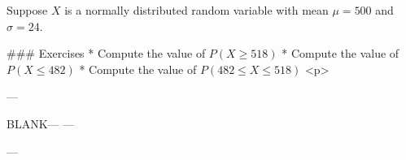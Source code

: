 
Suppose $X$ is a normally distributed random variable with mean $\mu =500$ and $\sigma = 24$.

### Exercises 
*  Compute the value of $P(X \geq 518)$
*  Compute the value of $P(X \leq 482)$
*  Compute the value of $P(482 \leq X \leq 518)$
<p>

---

BLANK---
---

---
